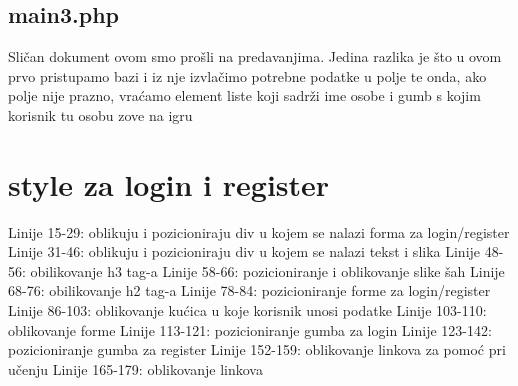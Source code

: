 \documentclass{article}
\begin{document}
\subsection{main3.php}

Sličan dokument ovom smo prošli na predavanjima. Jedina razlika je što u ovom prvo pristupamo bazi i iz nje izvlačimo potrebne podatke u polje te onda, ako polje nije prazno, vraćamo element liste koji sadrži ime osobe i gumb s kojim korisnik tu osobu zove na igru

\section{style za login i register}

Linije 15-29: oblikuju i pozicioniraju div u kojem se nalazi forma za login/register
\newline\newline
Linije 31-46: oblikuju i pozicioniraju div u kojem se nalazi tekst i slika
\newline\newline
Linije 48-56: obilikovanje \nless h3 \ngtr tag-a
\newline\newline
Linije 58-66: pozicioniranje i oblikovanje slike šah
\newline\newline
Linije 68-76: obilikovanje  \nless h2 \ngtr tag-a
\newline\newline
Linije 78-84: pozicioniranje forme za login/register
\newline\newline
Linije 86-103: oblikovanje kućica u koje korisnik unosi podatke
\newline\newline
Linije 103-110: oblikovanje forme
\newline\newline
Linije 113-121: pozicioniranje gumba za login
\newline\newline
Linije 123-142: pozicioniranje gumba za register
\newline\newline
Linije 152-159: oblikovanje linkova za pomoć pri učenju
\newline\newline
Linije 165-179: oblikovanje linkova
\newline\newline
\end{document}
